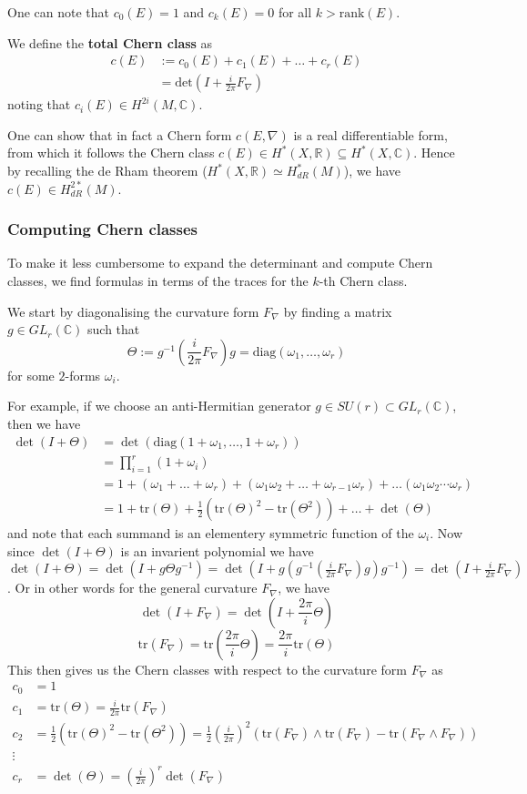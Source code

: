 \documentclass[a4paper]{article}
\theoremstyle{definition} \newtheorem*{definition}{Definition}
\theoremstyle{definition} \newtheorem*{definitions}{Definitions}
\theoremstyle{plain} \newtheorem{theorem}{Theorem}[section]
\theoremstyle{plain} \newtheorem{proposition}[theorem]{Proposition}
\theoremstyle{plain} \newtheorem{corollary}[theorem]{Corollary}
\theoremstyle{plain} \newtheorem{lemma}[theorem]{Lemma}
\theoremstyle{plain} \newtheorem{example}[theorem]{Example}
\newcommand{\defn}[1]{\textbf{#1}}
\newcommand{\realnos}{\mathbb{R}}
\newcommand{\complexnos}{\mathbb{C}}
\newcommand{\tr}{\text{tr}}
\begin{document}
One can note that $c_0(E)=1$ and $c_k(E)=0$ for all $k>\text{rank}(E)$. 

We define the \defn{total Chern class} as 
\begin{align*}
c(E)& :=c_0(E)+c_1(E)+\ldots +c_r(E) \\
& = \text{det} \left( I + \frac{i}{2\pi} F_\nabla \right)
\end{align*}
noting that $c_i(E)\in H^{2i}(M, \complexnos)$.

One can show that in fact a Chern form $c(E, \nabla)$ is a real differentiable form, from which it follows the Chern class $c(E)\in H^*(X, \realnos)\subseteq H^*(X, \complexnos)$.  Hence by recalling the de Rham theorem ($H^*(X, \realnos)\simeq H^*_{dR}(M)$), we have $c(E)\in H^{2*}_{dR}(M)$.

\subsubsection{Computing Chern classes}
To make it less cumbersome to expand the determinant and compute Chern classes, we find formulas in terms of the traces for the $k$-th Chern class. 

We start by diagonalising the curvature form $F_\nabla$ by finding a matrix $g\in GL_r(\complexnos)$ such that
$$\Theta := g^{-1}\left( \frac{i}{2\pi} F_\nabla \right) g = \text{diag}(\omega_1, \ldots, \omega_r)$$
for some $2$-forms $\omega_i$. 

For example, if we choose an anti-Hermitian generator $g\in SU(r)\subset GL_r(\complexnos)$, then we have
\begin{align*}
    \det(I+\Theta) &= \det (\text{diag}(1+\omega_1, \ldots, 1+\omega_r)) \\
    & = \prod_{i=1}^r (1+\omega_i) \\
    & = 1 + (\omega_1 + \ldots + \omega_r) + (\omega_1\omega_2 +\ldots + \omega_{r-1}\omega_r) + \ldots (\omega_1\omega_2\cdots \omega_r) \\
    & = 1 + \tr(\Theta) + \frac{1}{2}(\tr(\Theta)^2 - \tr(\Theta^2)) + \ldots + \det (\Theta) 
\end{align*}
and note that each summand is an elementery symmetric function of the $\omega_i$.
Now since $\det(I+\Theta)$ is an invarient polynomial we have $\det(I+\Theta)=\det(I+g\Theta g^{-1})=\det(I+g (g^{-1} (\frac{i}{2\pi} F_\nabla) g) g^{-1}) = \det (I+ \frac{i}{2\pi} F_\nabla)$. 
Or in other words for the general curvature $F_\nabla$, we have 
$$\det(I+F_\nabla)=\det(I+\frac{2\pi}{i}\Theta)$$
$$\tr(F_\nabla)= \tr( \frac{2\pi}{i} \Theta)= \frac{2\pi}{i} \tr(\Theta)$$
This then gives us the Chern classes with respect to the curvature form $F_\nabla$ as
\begin{align*}
    c_0 & = 1 \\
    c_1 & = \tr(\Theta) = \frac{i}{2\pi} \tr(F_\nabla)
    \\
     c_2 & = \frac{1}{2}(\tr(\Theta)^2 - \tr(\Theta^2))  = \frac{1}{2} \left( \frac{i}{2\pi} \right)^2 (\tr(F_\nabla)\wedge\tr(F_\nabla) - \tr(F_\nabla\wedge F_\nabla)) \\
    \vdots & \\
     c_r & = \det(\Theta)=\left( \frac{i}{2\pi} \right)^r \det(F_\nabla) 
\end{align*}
\end{document}
